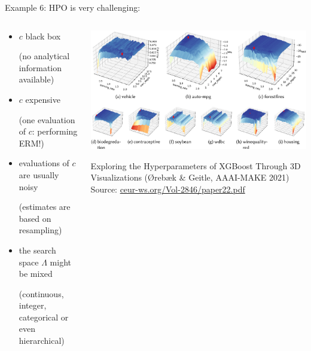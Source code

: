 \documentclass[11pt,compress,t,notes=noshow, xcolor=table]{beamer}
\begin{document}
\begin{vbframe}{Example 6: HPO}
is very challenging:  
\vspace*{-0.2cm} 
\begin{columns}
	\begin{column}{0.6\textwidth}
	\begin{itemize}
		\item $c$ black box \\
		\begin{footnotesize}(no analytical information available)\end{footnotesize}
		\item $c$ expensive \\
		\begin{footnotesize}
		(one evaluation of $c$: performing ERM!)
		\end{footnotesize}
		\item evaluations of $c$ are usually noisy \\
		\begin{footnotesize}
		(estimates are based on resampling)
		\end{footnotesize}
  		\item the search space $\Lambda$ might be mixed 
		\begin{footnotesize}
		(continuous, integer, categorical or even hierarchical)
		\end{footnotesize}
	\end{itemize}
	\end{column}
 	\begin{column}{0.35\textwidth}
		\begin{center}
			\includegraphics[width = 1.0\textwidth]{figure_man/landscapes.png}
			\begin{footnotesize}
				{Exploring the Hyperparameters of XGBoost Through 3D Visualizations ({\O}reb{\ae}k \& Geitle, AAAI-MAKE 2021)}
				\newline
				\tiny{Source: \url{ceur-ws.org/Vol-2846/paper22.pdf}}
			\end{footnotesize}
		\end{center}
  \end{column}
\end{columns}
\end{vbframe}
\end{document}
